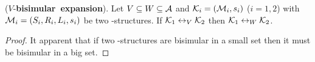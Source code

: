 \documentclass{article}
\begin{document}
\begin{proposition}\label{pro:VB:expa}
($V$-\textbf{bisimular\ expansion}). Let $V\subseteq W\subseteq {\cal A}$ and ${\cal K}_i=({\cal M}_i, s_i)$ ($i=1,2$) with ${\cal M}_i=(S_i, R_i, L_i,s_i)$ be two \MPK-structures. If ${\cal K}_1 \leftrightarrow_V {\cal K}_2$ then ${\cal K}_1 \leftrightarrow_W {\cal K}_2$.
\end{proposition}
\begin{proof}
It apparent that if two \MPK-structures are bisimular in a small set then it must be bisimular in a big set.
%
%
\end{proof}
\end{document}
